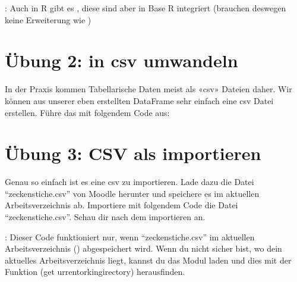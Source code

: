 \documentclass[letterpaper,10pt,english]{sphinxmanual}
\begin{document}
: Auch in R gibt es , diese sind aber in Base R integriert (brauchen deswegen keine Erweiterung wie )


\section{Übung 2:  in csv umwandeln}
\label{\detokenize{01_04_Tabellarische_Daten:ubung-2-dataframe-in-csv-umwandeln}}
In der Praxis kommen Tabellarische Daten meist als «csv» Dateien daher. Wir können aus unserer eben erstellten DataFrame sehr einfach eine csv Datei erstellen. Führe das mit folgendem Code aus:

\begin{sphinxVerbatim}[commandchars=\\\{\}]
\end{sphinxVerbatim}


\section{Übung 3: CSV als  importieren}
\label{\detokenize{01_04_Tabellarische_Daten:ubung-3-csv-als-dataframe-importieren}}
Genau so einfach ist es eine csv zu importieren. Lade dazu die Datei “zeckenstiche.csv” von Moodle herunter und speichere es im aktuellen Arbeitsverzeichnis ab. Importiere mit folgendem Code die Datei “zeckenstiche.csv”. Schau dir  nach dem importieren an.

\begin{sphinxVerbatim}[commandchars=\\\{\}]
  
\end{sphinxVerbatim}

: Dieser Code funktioniert nur, wenn “zeckenstiche.csv” im aktuellen Arbeitsverzeichnis () abgespeichert wird. Wenn du nicht sicher bist, wo dein aktuelles Arbeitsverzeichnis liegt, kannst du das Modul  laden und dies mit der Funktion  (get urrentorkingirectory) herausfinden.
\end{document}
